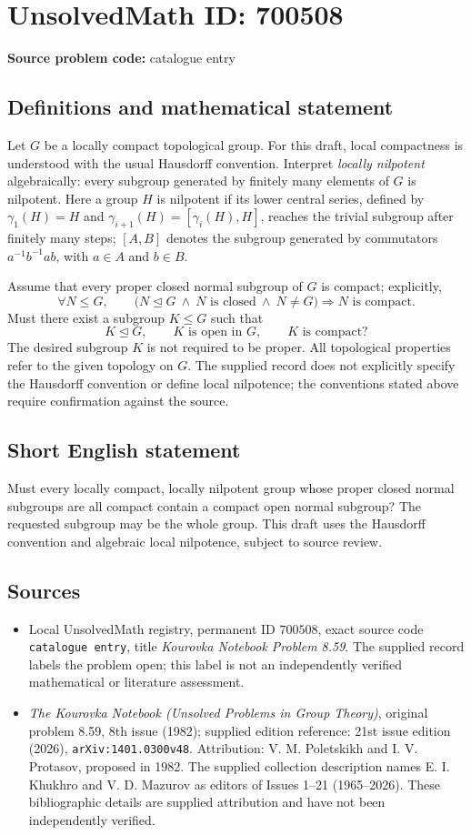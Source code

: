 \documentclass[11pt]{article}
\begin{document}
\section*{UnsolvedMath ID: 700508}
\textbf{Source problem code:} catalogue entry
\subsection{Definitions and mathematical statement}
Let \(G\) be a locally compact topological group. For this draft, local compactness is understood with the usual Hausdorff convention. Interpret \emph{locally nilpotent} algebraically: every subgroup generated by finitely many elements of \(G\) is nilpotent. Here a group \(H\) is nilpotent if its lower central series, defined by \(\gamma_1(H)=H\) and \(\gamma_{i+1}(H)=[\gamma_i(H),H]\), reaches the trivial subgroup after finitely many steps; \([A,B]\) denotes the subgroup generated by commutators \(a^{-1}b^{-1}ab\), with \(a\in A\) and \(b\in B\).

Assume that every proper closed normal subgroup of \(G\) is compact; explicitly,
\[
\forall N\leq G,\qquad
\bigl(N\trianglelefteq G\ \land\ N\text{ is closed}\ \land\ N\ne G\bigr)
\Longrightarrow N\text{ is compact}.
\]
Must there exist a subgroup \(K\leq G\) such that
\[
K\trianglelefteq G,\qquad K\text{ is open in }G,\qquad K\text{ is compact}?
\]
The desired subgroup \(K\) is not required to be proper. All topological properties refer to the given topology on \(G\). The supplied record does not explicitly specify the Hausdorff convention or define local nilpotence; the conventions stated above require confirmation against the source.
\subsection{Short English statement}
Must every locally compact, locally nilpotent group whose proper closed normal subgroups are all compact contain a compact open normal subgroup? The requested subgroup may be the whole group. This draft uses the Hausdorff convention and algebraic local nilpotence, subject to source review.
\subsection{Sources}
\begin{itemize}
\item Local UnsolvedMath registry, permanent ID \(700508\), exact source code \texttt{catalogue entry}, title \emph{Kourovka Notebook Problem 8.59}. The supplied record labels the problem open; this label is not an independently verified mathematical or literature assessment.
\item \emph{The Kourovka Notebook (Unsolved Problems in Group Theory)}, original problem 8.59, 8th issue (1982); supplied edition reference: 21st issue edition (2026), \texttt{arXiv:1401.0300v48}. Attribution: V. M. Poletskikh and I. V. Protasov, proposed in 1982. The supplied collection description names E. I. Khukhro and V. D. Mazurov as editors of Issues 1--21 (1965--2026). These bibliographic details are supplied attribution and have not been independently verified.
\end{itemize}
\end{document}
